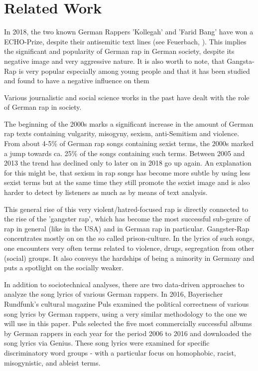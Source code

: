 \section{Related Work}\label{sec:research}

In 2018, the two known German Rappers 'Kollegah' and 'Farid Bang' have won a ECHO-Prize, despite their antisemitic text lines (see Feuerbach, \cite{kollegahfarid}).
This implies the significant and popularity of German rap in German society, despite its negative image and very aggressive nature. It is also worth to note, that Gangsta-Rap is very popular especially among young people and that it has been studied and found to have a negative influence on them \cite{jugendeinfluss, bielefeld_studie,salomo_greven_2021}

Various journalistic and social science works in the past have dealt with the role of German rap in society.

The beginning of the 2000s marks a significant increase in the amount of German rap texts containing vulgarity, misogyny, sexism, anti-Semitism and violence. From about 4-5\% of German rap songs containing sexist terms, the 2000s marked a jump towards ca. 25\% of the songs containing such terms. Between 2005 and 2013 the trend has declined only to later on in 2018 go up again. An explanation for this might be, that sexism in rap songs has become more subtle by using less sexist terms but at the same time they still promote the sexist image and is also harder to detect by listeners as much as by means of text analysis. \cite{rohwer_2020}

This general rise of this very violent/hatred-focused rap is directly connected to the rise of the 'gangster rap', which has become the most successful sub-genre of rap in general (like in the USA) and in German rap in particular.
Gangster-Rap concentrates mostly on on the so called prison-culture. In the lyrics of such songs, one encounters very often terms related to violence, drugs, segregation from other (social) groups. It also conveys the hardships of being a minority in Germany and puts a spotlight on the socially weaker. \cite{wiegangsta}



In addition to sociotechnical analyses, there are two data-driven approaches to analyze the song lyrics of various German rappers. In 2016, Bayerischer Rundfunk's cultural magazine Puls \cite{puls_2016} examined the political correctness of various song lyrics by German rappers, using a very similar methodology to the one we will use in this paper. Puls selected the five most commercially successful albums by German rappers in each year for the period 2006 to 2016 and downloaded the song lyrics via Genius. These song lyrics were examined for specific discriminatory word groups - with a particular focus on homophobic, racist, misogynistic, and ableist terms.

